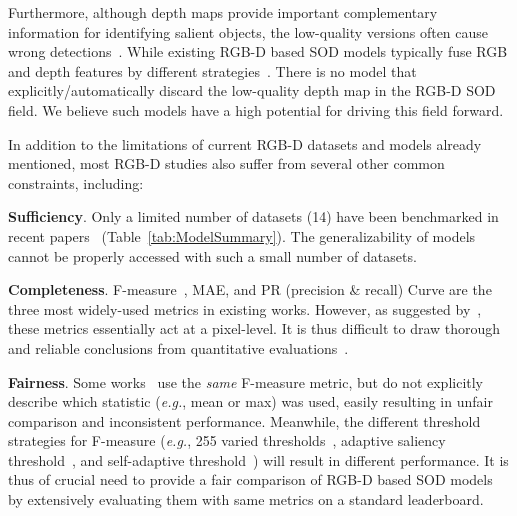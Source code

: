 \documentclass[journal]{IEEEtran}
\def\eg{\emph{e.g.}}
\newcommand{\tabref}[1]{Table~\ref{#1}}
\newcommand{\fdp}[1]{#1}
\begin{document}
Furthermore, although depth map\fdp{s provide} important complementary information
for identifying salient objects, \fdp{the low-quality versions often}
cause wrong detections~\cite{cong2016saliency}.
While existing RGB-D based SOD models typically fuse RGB and depth features by
different strategies~\cite{zhao2019Contrast}.
\fdp{There is no model that explicitly/automatically discard
the low-quality depth map in the RGB-D SOD field.}
We believe such models \fdp{have a high potential for driving} this field forward.



\fdp{In addition to} the limitations of current RGB-D datasets and models \fdp{already mentioned},
most RGB-D \fdp{studies} also suffer from \fdp{several other} common \fdp{constraints}, including:

\textbf{Sufficiency}. Only \fdp{a} limited \fdp{number of } datasets (14) \fdp{have been}
benchmarked in recent papers~\cite{peng2014rgbd,cong2018review} (\tabref{tab:ModelSummary}).
The \fdp{generalizability} of models cannot be properly accessed with such a small number of datasets.


\textbf{Completeness}. F-measure~\cite{achanta2009frequency}, MAE, and
PR \fdp{(precision \& recall) Curve} are the three \fdp{most} widely-used metrics in existing works.
However, as suggested by~\cite{fan2017structure,Fan2018Enhanced}, these metrics
essentially \fdp{act at a pixel-level}.
It is \fdp{thus} difficult to draw thorough and reliable conclusions
from quantitative evaluations~\cite{margolin2014evaluate}.


\textbf{Fairness}.
Some works~\cite{zhao2019Contrast,wang2019adaptive,chen2018progressively} use the
\emph{same} F-measure metric, \fdp{but} do not explicitly describe which
statistic (\eg, mean or max)
\fdp{was used}, easily resulting in unfair
comparison and inconsistent performance.
Meanwhile, the different threshold strategies \fdp{for} F-measure (\eg, 255 varied thresholds~\cite{wang2019adaptive,zhao2019Contrast,du2016improving},
adaptive saliency threshold~\cite{peng2014rgbd,feng2016local}, and self-adaptive threshold~\cite{han2017cnns})
will result in different performance.
\fdp{It is thus of crucial need to provide a fair comparison of} RGB-D based SOD models by extensively
evaluating them with same metrics on a standard leaderboard.
\end{document}
